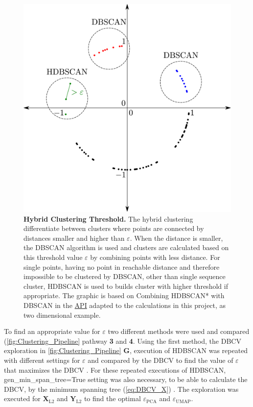 \begin{figure}[!hbt]
    \centering
    \includegraphics[width=\textwidth]{Graphics/Hybrid.pdf}
    \caption[Hybrid Clustering Threshold]{\textbf{Hybrid Clustering Threshold.} The hybrid clustering differentiate between clusters where points are connected by distances smaller and higher than $\varepsilon$. When the distance is smaller, the \gls{DBSCAN} algorithm is used and clusters are calculated based on this threshold value $\varepsilon$ by combining points with less distance. For single points, having no point in reachable distance and therefore impossible to be clustered by \gls{DBSCAN}, other than single sequence cluster, \gls{HDBSCAN} is used to builds cluster with higher threshold if appropriate. The graphic is based on \glqq Combining HDBSCAN* with DBSCAN\grqq{} in the \href{https://hdbscan.readthedocs.io/en/latest/api.html}{API} adapted to the calculations in this project, as two dimensional example.}
    \label{fig:Hybrid}
\end{figure}

To find an appropriate value for $\varepsilon$ two different methods were used and compared (\autoref{fig:Clustering_Pipeline} pathway \textsf{\textbf{3}} and \textsf{\textbf{4}}. Using the first method, the \gls{DBCV} exploration in \autoref{fig:Clustering_Pipeline} \textsf{\textbf{G}}, execution of \gls{HDBSCAN} was repeated with different settings for $\varepsilon$ and compared by the \gls{DBCV} to find the value of $\varepsilon$ that maximizes the \gls{DBCV} \autocite{moulavi_density-based_2014}. For these repeated executions of \gls{HDBSCAN}, \colorbox{backcolour}{gen\_min\_span\_tree=True} setting was also necessary, to be able to calculate the \gls{DBCV}, by the minimum spanning tree (\autoref{eq:DBCV_X}) \autocite{moulavi_density-based_2014, gower_minimum_1969}. The exploration was executed for $\mathbf{X}_{\text{L2}}$ and $\mathbf{Y}_{\text{L2}}$ to find the optimal $\varepsilon_{\text{PCA}}$ and $\varepsilon_{\text{UMAP}}$.

